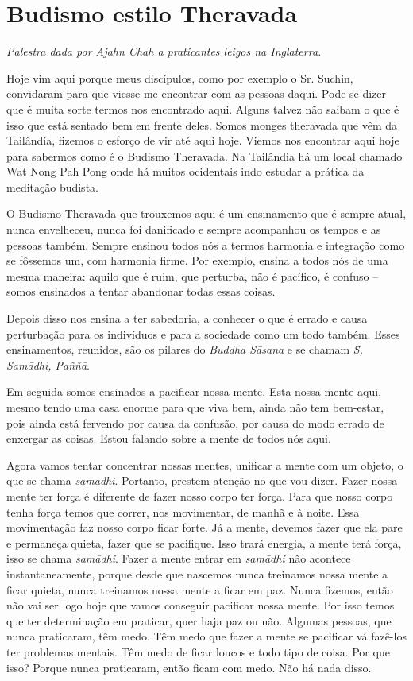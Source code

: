 
\chapter{Budismo estilo Theravada}

{\itshape
Palestra dada por Ajahn Chah a praticantes leigos na Inglaterra.}

Hoje vim aqui porque meus discípulos, como por exemplo o Sr. Suchin,
convidaram para que viesse me encontrar com as pessoas daqui. Pode-se
dizer que é muita sorte termos nos encontrado aqui. Alguns talvez não
saibam o que é isso que está sentado bem em frente deles. Somos monges
theravada que vêm da Tailândia, fizemos o esforço de vir até aqui hoje.
Viemos nos encontrar aqui hoje para sabermos como é o Budismo
Theravada. Na Tailândia há um local chamado Wat Nong Pah Pong onde há
muitos ocidentais indo estudar a prática da meditação budista. 

O Budismo Theravada que trouxemos aqui é um ensinamento que é sempre
atual, nunca envelheceu, nunca foi danificado e sempre acompanhou os
tempos e as pessoas também. Sempre ensinou todos nós a termos harmonia
e integração como se fôssemos um, com harmonia firme. Por exemplo,
ensina a todos nós de uma mesma maneira: aquilo que é ruim, que
perturba, não é pacífico, é confuso – somos ensinados a tentar
abandonar todas essas coisas. 

Depois disso nos ensina a ter sabedoria, a conhecer o que é errado e
causa perturbação para os indivíduos e para a sociedade como um todo
também. Esses ensinamentos, reunidos, são os pilares do \textit{Buddha
S\=asana} e se chamam \textit{S\=\ila, Sam\=adhi, Paññ\=a}.

Em seguida somos ensinados a pacificar nossa mente. Esta nossa mente
aqui, mesmo tendo uma casa enorme para que viva bem, ainda não tem
bem-estar, pois ainda está fervendo por causa da confusão, por causa do
modo errado de enxergar as coisas. Estou falando sobre a mente de todos
nós aqui.

Agora vamos tentar concentrar nossas mentes, unificar a mente com um
objeto, o que se chama \textit{sam\=adhi}. Portanto, prestem atenção no
que vou dizer. Fazer nossa mente ter força é diferente de fazer nosso
corpo ter força. Para que nosso corpo tenha força temos que correr, nos
movimentar, de manhã e à noite. Essa movimentação faz nosso corpo ficar
forte. Já a mente, devemos fazer que ela pare e permaneça quieta, fazer
que se pacifique. Isso trará energia, a mente terá força, isso se chama
\textit{sam\=adhi}. Fazer a mente entrar em \textit{sam\=adhi }não
acontece instantaneamente, porque desde que nascemos nunca treinamos
nossa mente a ficar quieta, nunca treinamos nossa mente a ficar em paz.
Nunca fizemos, então não vai ser logo hoje que vamos conseguir
pacificar nossa mente. Por isso temos que ter determinação em praticar,
quer haja paz ou não. Algumas pessoas, que nunca praticaram, têm medo.
Têm medo que fazer a mente se pacificar vá fazê-los ter problemas
mentais. Têm medo de ficar loucos e todo tipo de coisa. Por que isso?
Porque nunca praticaram, então ficam com medo. Não há nada disso. 

